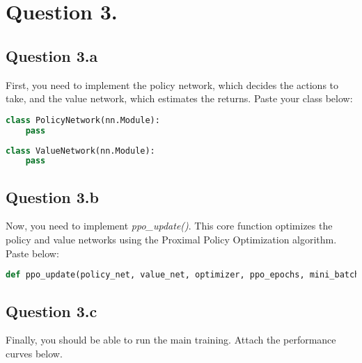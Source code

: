 \documentclass[12pt]{article}
\begin{document}
\section*{Question 3.}

\subsection*{Question 3.a} 
First, you need to implement the policy network, which decides the actions to take, and the value network, which estimates the returns.
Paste your class below:
\begin{solution}
\begin{lstlisting}[language=Python]
class PolicyNetwork(nn.Module):
    pass
\end{lstlisting}
\begin{lstlisting}[language=Python]
class ValueNetwork(nn.Module):
    pass
\end{lstlisting}
\end{solution}

\subsection*{Question 3.b} 
Now, you need to implement \emph{ppo\_update()}. This core function optimizes the policy and value networks using the Proximal Policy Optimization algorithm.
Paste below:
\begin{solution}
\begin{lstlisting}[language=Python]
def ppo_update(policy_net, value_net, optimizer, ppo_epochs, mini_batch_size, states, actions, log_probs, returns, advantages, clip_param=0.2):
\end{lstlisting}
\end{solution}

\subsection*{Question 3.c} 
Finally, you should be able to run the main training. Attach the performance curves below.
\begin{solution}

\end{solution}
\end{document}
